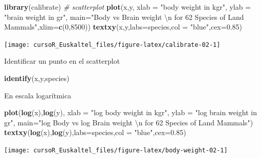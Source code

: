\documentclass[]{book}
\newenvironment{Shaded}{\begin{snugshade}}{\end{snugshade}}
\newcommand{\KeywordTok}[1]{\textcolor[rgb]{0.13,0.29,0.53}{\textbf{#1}}}
\newcommand{\DataTypeTok}[1]{\textcolor[rgb]{0.13,0.29,0.53}{#1}}
\newcommand{\DecValTok}[1]{\textcolor[rgb]{0.00,0.00,0.81}{#1}}
\newcommand{\FloatTok}[1]{\textcolor[rgb]{0.00,0.00,0.81}{#1}}
\newcommand{\CharTok}[1]{\textcolor[rgb]{0.31,0.60,0.02}{#1}}
\newcommand{\StringTok}[1]{\textcolor[rgb]{0.31,0.60,0.02}{#1}}
\newcommand{\CommentTok}[1]{\textcolor[rgb]{0.56,0.35,0.01}{\textit{#1}}}
\newcommand{\NormalTok}[1]{#1}
\begin{document}
\begin{Shaded}
\begin{Highlighting}[]
\KeywordTok{library}\NormalTok{(calibrate)}
\CommentTok{# scatterplot}
\KeywordTok{plot}\NormalTok{(x,y, }\DataTypeTok{xlab =} \StringTok{"body weight in kgr"}\NormalTok{, }\DataTypeTok{ylab =} \StringTok{"brain weight in gr"}\NormalTok{, }
     \DataTypeTok{main=}\StringTok{"Body vs Brain weight }\CharTok{\textbackslash{}n}\StringTok{ for 62 Species of Land Mammals"}\NormalTok{,}\DataTypeTok{xlim=}\KeywordTok{c}\NormalTok{(}\DecValTok{0}\NormalTok{,}\DecValTok{8500}\NormalTok{))}
\KeywordTok{textxy}\NormalTok{(x,y,}\DataTypeTok{labs=}\NormalTok{species,}\DataTypeTok{col =} \StringTok{"blue"}\NormalTok{,}\DataTypeTok{cex=}\FloatTok{0.85}\NormalTok{) }
\end{Highlighting}
\end{Shaded}

\begin{center}\texttt{[image: cursoR\_Euskaltel\_files/figure-latex/calibrate-02-1]} \end{center}

Identificar un punto en el scatterplot

\begin{Shaded}
\begin{Highlighting}[]
\KeywordTok{identify}\NormalTok{(x,y,species)}
\end{Highlighting}
\end{Shaded}

En escala logarítmica

\begin{Shaded}
\begin{Highlighting}[]
\KeywordTok{plot}\NormalTok{(}\KeywordTok{log}\NormalTok{(x),}\KeywordTok{log}\NormalTok{(y), }\DataTypeTok{xlab =} \StringTok{"log body weight in kgr"}\NormalTok{, }\DataTypeTok{ylab =} \StringTok{"log brain weight in gr"}\NormalTok{, }
     \DataTypeTok{main=}\StringTok{"log Body vs log Brain weight }\CharTok{\textbackslash{}n}\StringTok{ for 62 Species of Land Mammals"}\NormalTok{)}
\KeywordTok{textxy}\NormalTok{(}\KeywordTok{log}\NormalTok{(x),}\KeywordTok{log}\NormalTok{(y),}\DataTypeTok{labs=}\NormalTok{species,}\DataTypeTok{col =} \StringTok{"blue"}\NormalTok{,}\DataTypeTok{cex=}\FloatTok{0.85}\NormalTok{) }
\end{Highlighting}
\end{Shaded}

\begin{center}\texttt{[image: cursoR\_Euskaltel\_files/figure-latex/body-weight-02-1]} \end{center}
\end{document}
